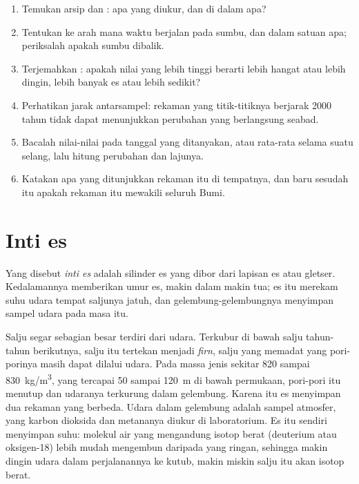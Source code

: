\begin{method}
\begin{enumerate}
  \item Temukan arsip dan : apa yang diukur, dan di dalam apa?
  \item Tentukan ke arah mana waktu berjalan pada sumbu, dan dalam satuan apa;
        periksalah apakah sumbu  dibalik.
  \item Terjemahkan : apakah nilai yang lebih tinggi berarti lebih
        hangat atau lebih dingin, lebih banyak es atau lebih sedikit?
  \item Perhatikan jarak antarsampel: rekaman yang titik-titiknya berjarak
        \num{2000} tahun tidak dapat menunjukkan perubahan yang berlangsung
        seabad.
  \item Bacalah nilai-nilai pada tanggal yang ditanyakan, atau rata-rata
        selama suatu selang, lalu hitung perubahan dan lajunya.
  \item Katakan apa yang ditunjukkan rekaman itu di tempatnya, dan baru
        sesudah itu apakah rekaman itu mewakili seluruh Bumi.
\end{enumerate}
\end{method}

\section{Inti es}

\begin{definition}[Inti es]\label{def:g12:past-climates:ice-core}
Yang disebut \emph{inti es} adalah silinder es yang dibor dari
lapisan es atau gletser. Kedalamannya memberikan umur es, makin dalam makin
tua; es itu merekam suhu udara tempat saljunya jatuh, dan gelembung-gelembungnya
menyimpan sampel udara pada masa itu.
\end{definition}

Salju segar sebagian besar terdiri dari udara. Terkubur di bawah salju
tahun-tahun berikutnya, salju itu tertekan menjadi \emph{firn}, salju yang
memadat yang pori-porinya masih dapat dilalui udara. Pada massa jenis sekitar
820 sampai \qty{830}{kg/m^3}, yang tercapai 50 sampai \qty{120}{m} di bawah
permukaan, pori-pori itu menutup dan udaranya terkurung dalam gelembung. Karena
itu es menyimpan dua rekaman yang berbeda. Udara dalam gelembung adalah sampel
atmosfer, yang karbon dioksida dan metananya diukur di laboratorium. Es itu
sendiri menyimpan suhu: molekul air yang mengandung isotop berat (deuterium
atau oksigen-18) lebih mudah mengembun daripada yang ringan, sehingga makin
dingin udara dalam perjalanannya ke kutub, makin miskin salju itu akan isotop
berat.

